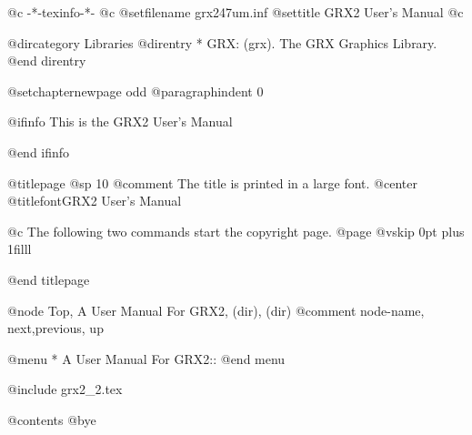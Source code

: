    @c -*-texinfo-*-
@c %
@setfilename grx247um.inf
@settitle GRX2 User's Manual
@c %

@dircategory Libraries
@direntry
* GRX: (grx).                   The GRX Graphics Library.
@end direntry

@setchapternewpage odd
@paragraphindent 0

@ifinfo
This is the GRX2 User's Manual

@end ifinfo

@titlepage
@sp 10
@comment The title is printed in a large font.
@center @titlefont{GRX2 User's Manual}

@c The following two commands start the copyright page.
@page
@vskip 0pt plus 1filll

@end titlepage


@node  Top, A User Manual For GRX2, (dir), (dir)
@comment node-name, next,previous, up

@menu
* A User Manual For GRX2::
@end menu

@include grx2_2.tex

@contents
@bye

